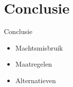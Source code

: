 \documentclass{beamer}
\begin{document}
\section{Conclusie}
\begin{frame}{Conclusie}
    \begin{itemize}
        \item Machtsmisbruik 
        \item Maatregelen
        \item Alternatieven 
    \end{itemize}
\end{frame}
\end{document}
